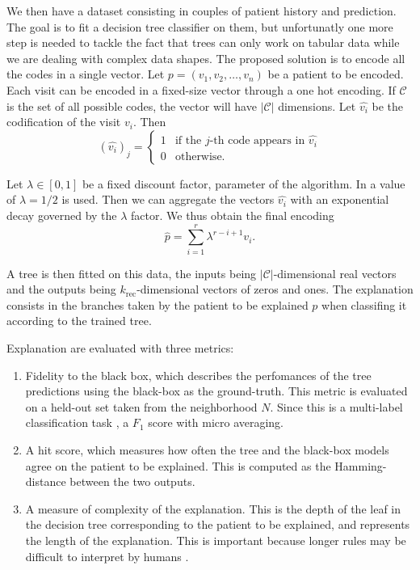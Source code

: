\documentclass[]{marticle}
\newcommand{\codes}{\mathcal{C}}
\begin{document}
We then have a dataset consisting in couples of patient history and prediction. The goal is to fit a
decision tree classifier on them, but unfortunatly one more step is needed to tackle the fact that
trees can only work on tabular data while we are dealing with complex data shapes. The proposed
solution is to encode all the codes in a single vector. Let $p=(v_1, v_2, \dots, v_n)$ be a patient
to be encoded. Each visit can be encoded in a fixed-size vector through a one hot encoding. If
$\codes$ is the set of all possible codes, the vector will have $|\codes|$ dimensions. Let
$\hat{v_i}$ be the codification of the visit $v_i$. Then
\begin{equation*}
    (\hat{v_i})_j = \begin{cases}
        1 &\text{if the $j$-th code appears in $\hat{v_i}$}  \\
        0 &\text{otherwise}.
    \end{cases}
\end{equation*}

Let $\lambda\in [0,1]$ be a fixed discount factor, parameter of the algorithm. In
\cite{panigutti-xai} a value of $\lambda = 1/2$ is used. Then we can aggregate the vectors
$\hat{v_i}$ with an exponential decay governed by the $\lambda$ factor. We thus obtain the final
encoding
\begin{equation*}
    \hat{p} = \sum_{i=1}^r \lambda^{r-i+1} v_i.
\end{equation*}

A tree is then fitted on this data, the inputs being $|\codes|$-dimensional real vectors and the
outputs being $k_\text{rec}$-dimensional vectors of zeros and ones. The explanation consists in the
branches taken by the patient to be explained $p$ when classifing it according to the trained tree.

Explanation are evaluated with three metrics:
\begin{enumerate}
\item Fidelity to the black box, which describes the perfomances of the tree predictions using the
black-box as the ground-truth. This metric is evaluated on a held-out set taken from the
neighborhood $N$. Since this is a multi-label classification task \cite{paper-multi-label}, a $F_1$
score with micro averaging.

\item A hit score, which measures how often the tree and the black-box models agree on the patient
to be explained. This is computed as the Hamming-distance between the two outputs.

\item A measure of complexity of the explanation. This is the depth of the leaf in the decision tree
corresponding to the patient to be explained, and represents the length of the explanation. This is
important because longer rules may be difficult to interpret by humans \cite{paper-lipton}.
\end{enumerate}
\end{document}
